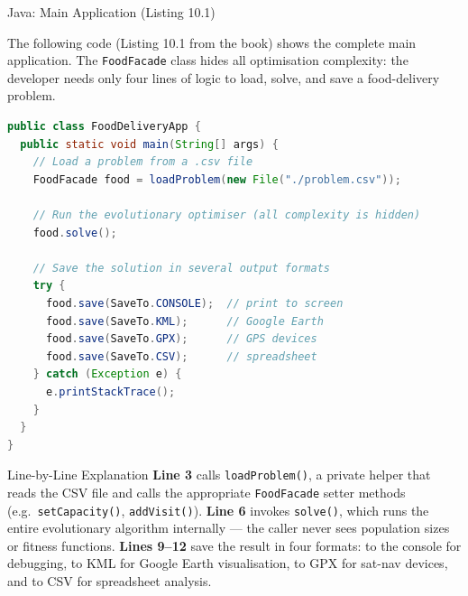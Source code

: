 \documentclass[aspectratio=169,10pt]{beamer}
\begin{document}
\begin{frame}[fragile]{Java: Main Application (Listing 10.1)}

  The following code (Listing 10.1 from the book) shows the complete
  main application.  The \texttt{FoodFacade} class hides all
  optimisation complexity: the developer needs only four lines of
  logic to load, solve, and save a food-delivery problem.

\begin{lstlisting}[language=Java,
    caption={Listing 10.1: The food application (Java).},
    label={lst:java_main}]
public class FoodDeliveryApp {
  public static void main(String[] args) {
    // Load a problem from a .csv file
    FoodFacade food = loadProblem(new File("./problem.csv"));

    // Run the evolutionary optimiser (all complexity is hidden)
    food.solve();

    // Save the solution in several output formats
    try {
      food.save(SaveTo.CONSOLE);  // print to screen
      food.save(SaveTo.KML);      // Google Earth
      food.save(SaveTo.GPX);      // GPS devices
      food.save(SaveTo.CSV);      // spreadsheet
    } catch (Exception e) {
      e.printStackTrace();
    }
  }
}
\end{lstlisting}

  \begin{exampleblock}{Line-by-Line Explanation}
    \textbf{Line 3} calls \texttt{loadProblem()}, a private helper
    that reads the CSV file and calls the appropriate \texttt{FoodFacade}
    setter methods (e.g.\ \texttt{setCapacity()}, \texttt{addVisit()}).
    \textbf{Line 6} invokes \texttt{solve()}, which runs the entire
    evolutionary algorithm internally — the caller never sees
    population sizes or fitness functions.
    \textbf{Lines 9--12} save the result in four formats: to the
    console for debugging, to KML for Google Earth visualisation, to
    GPX for sat-nav devices, and to CSV for spreadsheet analysis.
  \end{exampleblock}

\end{frame}
\end{document}
